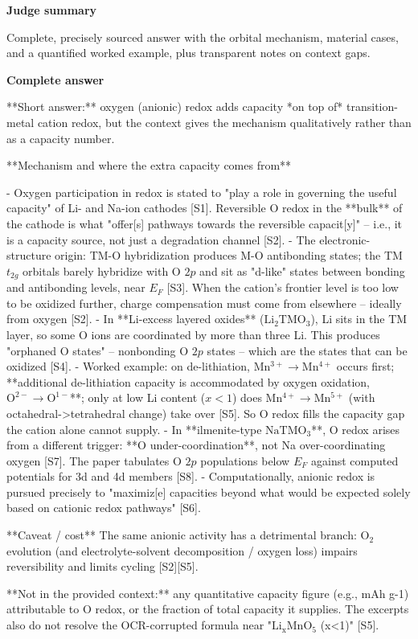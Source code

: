 \documentclass[10pt]{article}
\begin{document}
\textbf{Judge summary}
\begin{EvidenceText}
Complete, precisely sourced answer with the orbital mechanism, material cases, and a quantified worked example, plus transparent notes on context gaps.
\end{EvidenceText}

\textbf{Complete answer}
\begin{AnswerText}
**Short answer:** oxygen (anionic) redox adds capacity *on top of* transition-metal cation redox, but the context gives the mechanism qualitatively rather than as a capacity number.

**Mechanism and where the extra capacity comes from**

- Oxygen participation in redox is stated to "play a role in governing the useful capacity" of Li- and Na-ion cathodes [S1]. Reversible O redox in the **bulk** of the cathode is what "offer[s] pathways towards the reversible capacit[y]" -- i.e., it is a capacity source, not just a degradation channel [S2].
- The electronic-structure origin: TM-O hybridization produces M-O antibonding states; the TM $t_{2g}$ orbitals barely hybridize with O $2p$ and sit as "d-like" states between bonding and antibonding levels, near $E_F$ [S3]. When the cation's frontier level is too low to be oxidized further, charge compensation must come from elsewhere -- ideally from oxygen [S2].
- In **Li-excess layered oxides** ($\mathrm{Li_2TMO_3}$), Li sits in the TM layer, so some O ions are coordinated by more than three Li. This produces "orphaned O states" -- nonbonding O $2p$ states -- which are the states that can be oxidized [S4].
- Worked example: on de-lithiation, $\mathrm{Mn^{3+}\!\to\!Mn^{4+}}$ occurs first; **additional de-lithiation capacity is accommodated by oxygen oxidation, $\mathrm{O^{2-}\!\to\!O^{1-}}$**; only at low Li content ($x<1$) does $\mathrm{Mn^{4+}\!\to\!Mn^{5+}}$ (with octahedral->tetrahedral change) take over [S5]. So O redox fills the capacity gap the cation alone cannot supply.
- In **ilmenite-type $\mathrm{NaTMO_3}$**, O redox arises from a different trigger: **O under-coordination**, not Na over-coordinating oxygen [S7]. The paper tabulates O $2p$ populations below $E_F$ against computed potentials for 3d and 4d members [S8].
- Computationally, anionic redox is pursued precisely to "maximiz[e] capacities beyond what would be expected solely based on cationic redox pathways" [S6].

**Caveat / cost**
The same anionic activity has a detrimental branch: O$_2$ evolution (and electrolyte-solvent decomposition / oxygen loss) impairs reversibility and limits cycling [S2][S5].

**Not in the provided context:** any quantitative capacity figure (e.g., mAh g-1) attributable to O redox, or the fraction of total capacity it supplies. The excerpts also do not resolve the OCR-corrupted formula near "$\mathrm{Li_xMnO_5}$ (x<1)" [S5].
\end{AnswerText}
\end{document}
